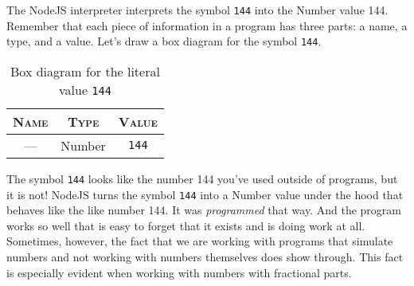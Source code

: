 The NodeJS interpreter interprets the symbol \texttt{144} into the \textsf{Number} value 144. Remember that each piece of information in a program has three parts: a name, a type, and a value. Let's draw a box diagram for the symbol \texttt{144}.

\begin{table}[h!]
  \begin{tabular}{|c|c|c|}
    \hline
    \textsc{Name} & \textsc{Type} & \textsc{Value}\\
    \hline
    --- & \textsf{Number} & \texttt{144}\\
    \hline
  \end{tabular}
  \caption{Box diagram for the literal value \texttt{144}}
\end{table}

The symbol \texttt{144} looks like the number 144 you've used outside of programs, but it is not! NodeJS turns the symbol \texttt{144} into a \textsf{Number} value under the hood that behaves like the like number 144. It was \emph{programmed} that way. And the program works so well that is easy to forget that it exists and is doing work at all. Sometimes, however, the fact that we are working with programs that simulate numbers and not working with numbers themselves does show through. This fact is especially evident when working with numbers with fractional parts.



